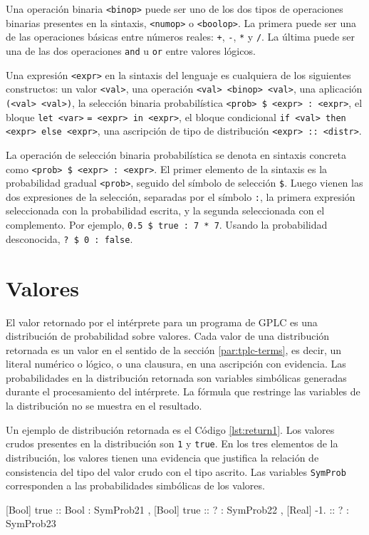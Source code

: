 Una operación binaria \lstinline|<binop>| puede ser uno de los dos tipos de operaciones binarias presentes en la sintaxis, \lstinline|<numop>| o \lstinline|<boolop>|. La primera puede ser una de las operaciones básicas entre números reales: \lstinline|+|, \lstinline|-|, \lstinline|*| y \lstinline|/|. La última puede ser una de las dos operaciones \lstinline|and| u \lstinline|or| entre valores lógicos.

Una expresión \lstinline|<expr>| en la sintaxis del lenguaje es cualquiera de los siguientes constructos: un valor \lstinline|<val>|, una operación \lstinline|<val> <binop> <val>|, una aplicación \lstinline|(<val> <val>)|, la selección binaria probabilística \lstinline|<prob> $ <expr> : <expr>|, el bloque \texttt{let <var>} \texttt{= <expr> in <expr>}, el bloque condicional \lstinline|if <val> then <expr> else <expr>|, una ascripción de tipo de distribución \lstinline|<expr> :: <distr>|.

La operación de selección binaria probabilística se denota en sintaxis
concreta como \lstinline|<prob> $ <expr> : <expr>|.  El primer
elemento de la sintaxis es la probabilidad gradual \lstinline|<prob>|,
seguido del símbolo de selección \lstinline|$|. Luego vienen las dos
expresiones de la selección, separadas por el símbolo \lstinline|:|,
la primera expresión seleccionada con la probabilidad escrita, y la
segunda seleccionada con el complemento. Por ejemplo,
\lstinline|0.5 $ true : 7 * 7|. Usando la probabilidad desconocida,
\lstinline|? $ 0 : false|.





\section{Valores}\label{sec:concreto-valor}
El valor retornado por el intérprete para un programa de GPLC es una
distribución de probabilidad sobre valores. Cada valor de una
distribución retornada es un valor en el sentido de la sección
\ref{par:tplc-terms}, es decir, un literal numérico o lógico, o
una clausura, en una ascripción con evidencia. Las probabilidades en la distribución retornada son variables simbólicas generadas durante el
procesamiento del intérprete. La fórmula que restringe las variables de la distribución no se muestra en el resultado.

Un ejemplo de distribución retornada es el Código \ref{lst:return1}. Los valores crudos presentes en la distribución son \lstinline|1| y \lstinline|true|. En los tres elementos de la distribución, los valores tienen una evidencia que justifica la relación de consistencia del tipo del valor crudo con el tipo ascrito. Las variables \lstinline|SymProb| corresponden a las probabilidades simbólicas de los valores.
\begin{gplcblock}[style=gplc-style,caption={Distribución simbólica de valores},label={lst:return1}]
{
	 [Bool] true :: Bool : SymProb21 ,
	 [Bool] true :: ? : SymProb22 ,
	 [Real] -1. :: ? : SymProb23 
}  
\end{gplcblock}

